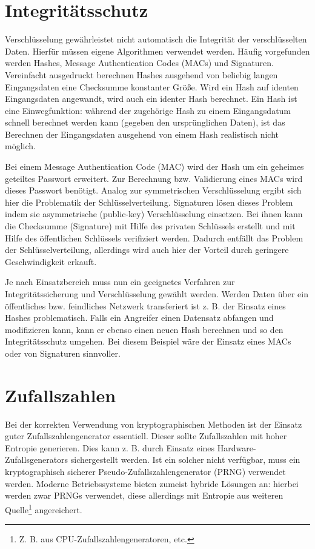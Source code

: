 \section{Integritätsschutz}

Verschlüsselung gewährleistet nicht automatisch die Integrität der verschlüsselten Daten. Hierfür müssen eigene Algorithmen verwendet werden. Häufig vorgefunden werden Hashes, Message Authentication Codes (MACs) und Signaturen. Vereinfacht ausgedruckt berechnen Hashes ausgehend von beliebig langen Eingangsdaten eine Checksumme konstanter Größe. Wird ein Hash auf identen Eingangsdaten angewandt, wird auch ein identer Hash berechnet. Ein Hash ist eine Einwegfunktion: während der zugehörige Hash zu einem Eingangsdatum schnell berechnet werden kann (gegeben den ursprünglichen Daten), ist das Berechnen der Eingangsdaten ausgehend von einem Hash realistisch nicht möglich.

Bei einem Message Authentication Code (MAC) wird der Hash um ein geheimes geteiltes Passwort erweitert. Zur Berechnung bzw. Validierung eines MACs wird dieses Passwort benötigt. Analog zur symmetrischen Verschlüsselung ergibt sich hier die Problematik der Schlüsselverteilung. Signaturen lösen dieses Problem indem sie asymmetrische (public-key) Verschlüsselung einsetzen. Bei ihnen kann die Checksumme (Signature) mit Hilfe des privaten Schlüssels erstellt und mit Hilfe des öffentlichen Schlüssels verifiziert werden. Dadurch entfällt das Problem der Schlüsselverteilung, allerdings wird auch hier der Vorteil durch geringere Geschwindigkeit erkauft.

Je nach Einsatzbereich muss nun ein geeignetes Verfahren zur Integritätssicherung und Verschlüsselung gewählt werden. Werden Daten über ein öffentliches bzw. feindliches Netzwerk transferiert ist z. B. der Einsatz eines Hashes problematisch. Falls ein Angreifer einen Datensatz abfangen und modifizieren kann, kann er ebenso einen neuen Hash berechnen und so den Integritätsschutz umgehen. Bei diesem Beispiel wäre der Einsatz eines MACs oder von Signaturen sinnvoller.

\section{Zufallszahlen}

Bei der korrekten Verwendung von kryptographischen Methoden ist der Einsatz guter Zufallszahlengenerator essentiell. Dieser sollte Zufallszahlen mit hoher Entropie generieren. Dies kann z. B. durch Einsatz eines Hardware-Zufallsgenerators sichergestellt werden. Ist ein solcher nicht verfügbar, muss ein kryptographisch sicherer Pseudo-Zufallszahlengenerator (PRNG) verwendet werden. Moderne Betriebssysteme bieten zumeist hybride Lösungen an: hierbei werden zwar PRNGs verwendet, diese allerdings mit Entropie aus weiteren Quelle\footnote{Z. B. aus CPU-Zufallszahlengeneratoren, etc.} angereichert.

